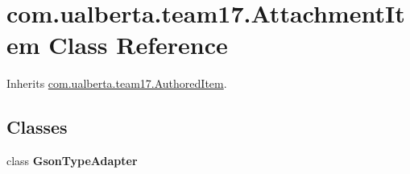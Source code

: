 \hypertarget{classcom_1_1ualberta_1_1team17_1_1_attachment_item}{\section{com.\+ualberta.\+team17.\+Attachment\+Item Class Reference}
\label{classcom_1_1ualberta_1_1team17_1_1_attachment_item}
}


Inherits \hyperlink{classcom_1_1ualberta_1_1team17_1_1_authored_item}{com.\+ualberta.\+team17.\+Authored\+Item}.

\subsection*{Classes}
\begin{DoxyCompactItemize}
\item 
class {\bfseries Gson\+Type\+Adapter}
\end{DoxyCompactItemize}
